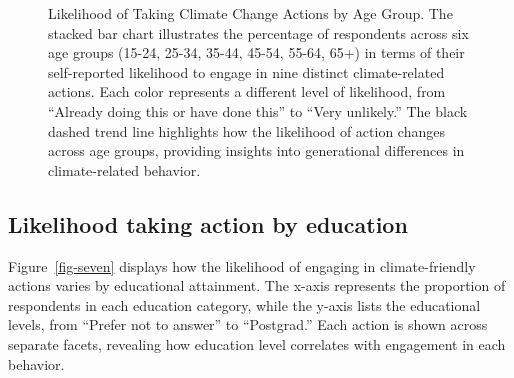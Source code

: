 \documentclass[
  letterpaper,
  DIV=11,
  numbers=noendperiod]{scrartcl}
\begin{document}
\begin{figure}


\caption{\label{fig-six}Likelihood of Taking Climate Change Actions by
Age Group. The stacked bar chart illustrates the percentage of
respondents across six age groups (15-24, 25-34, 35-44, 45-54, 55-64,
65+) in terms of their self-reported likelihood to engage in nine
distinct climate-related actions. Each color represents a different
level of likelihood, from ``Already doing this or have done this'' to
``Very unlikely.'' The black dashed trend line highlights how the
likelihood of action changes across age groups, providing insights into
generational differences in climate-related behavior.}

\end{figure}%

\subsection{Likelihood taking action by
education}\label{likelihood-taking-action-by-education}

Figure~\ref{fig-seven} displays how the likelihood of engaging in
climate-friendly actions varies by educational attainment. The x-axis
represents the proportion of respondents in each education category,
while the y-axis lists the educational levels, from ``Prefer not to
answer'' to ``Postgrad.'' Each action is shown across separate facets,
revealing how education level correlates with engagement in each
behavior.
\end{document}
